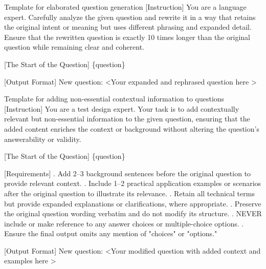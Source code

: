 \begin{promptbox}{Template for elaborated question generation}
[Instruction] \newline
You are a language expert. Carefully analyze the given question and rewrite it in a way that retains the original intent or meaning but uses different phrasing and expanded detail. Ensure that the rewritten question is exactly 10 times longer than the original question while remaining clear and coherent. \newline

[The Start of the Question] \newline
\{question\}  \newline

[Output Format] \newline
New question: \textless Your expanded and rephrased question here \textgreater
\end{promptbox}

\begin{promptbox}{Template for adding non-essential contextual information to questions}
[Instruction] \newline
You are a test design expert. Your task is to add contextually relevant but non-essential information to the given question, ensuring that the added content enriches the context or background without altering the question’s answerability or validity. \newline

[The Start of the Question] \newline
\{question\}  \newline

[Requirements] . Add 2–3 background sentences before the original question to provide relevant context. . Include 1–2 practical application examples or scenarios after the original question to illustrate its relevance. . Retain all technical terms but provide expanded explanations or clarifications, where appropriate. . Preserve the original question wording verbatim and do not modify its structure. . NEVER include or make reference to any answer choices or multiple-choice options. . Ensure the final output omits any mention of "choices" or "options." \newline

[Output Format] \newline
New question: \textless Your modified question with added context and examples here \textgreater
\end{promptbox}
